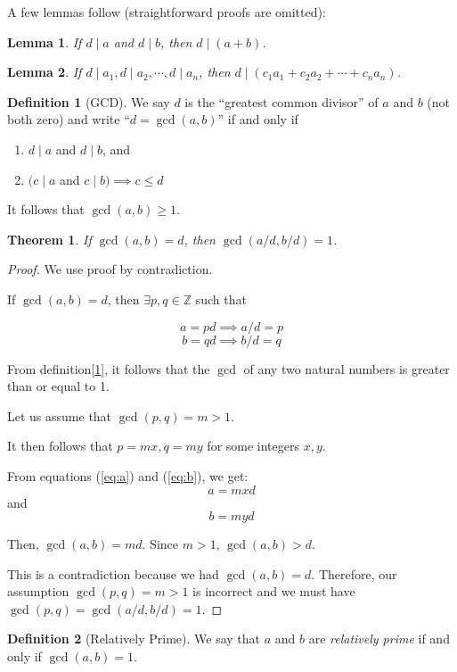 \documentclass[english,notitlepage,smartquotes]{hgbreport}
\theoremstyle{definition}
\newtheorem*{definition}{Definition}
\theoremstyle{remark}
\theoremstyle{plain}
\newtheorem{theorem}{Theorem}[chapter]
\newtheorem{lemma}{Lemma}[chapter]
\begin{document}
A few lemmas follow (straightforward proofs are omitted):
\begin{lemma}
\label{lemma:divides-sum}
If $d\mid a$ and $d\mid b$, then $d\mid(a+b)$.
\end{lemma}
\begin{lemma}
\label{lemma:divides-lin-comb}
If $d\mid a_1,d\mid a_2,\cdots, d\mid a_n$, then $d\mid(c_1a_1+c_2a_2+\cdots+c_na_n)$.
\end{lemma}
\begin{definition}[GCD]
\label{def:gcd}
We say $d$ is the ``greatest common divisor'' of $a$ and $b$ (not both zero) and write ``$d=\gcd(a, b)$'' if and only if
\begin{enumerate}
\item $d\mid a$ and $d\mid b$, and
\item $(c\mid a$ and $c\mid b)\implies c\leq d$
\end{enumerate}
\end{definition}

It follows that $\gcd(a, b)\geq 1$.

\begin{theorem}
\label{thm:gcd-multiple}
If $\gcd(a,b)=d$, then $\gcd(a/d, b/d)=1$.
\end{theorem}

\begin{proof}
We use proof by contradiction.

If $\gcd(a,b)=d$, then $\exists p,q\in\mathbb{Z}$ such that

\begin{equation}
\label{eq:a}
a=pd\implies a/d=p
\end{equation}
\begin{equation}
\label{eq:b}
b=qd\implies b/d=q
\end{equation}

From definition[\ref{def:gcd}], it follows that the $\gcd$ of any two natural numbers is greater than or equal to 1. 

Let us assume that $\gcd(p, q)=m>1$.

It then follows that $p=mx,q=my$ for some integers $x, y$.

From equations (\ref{eq:a}) and (\ref{eq:b}), we get:
$$
a=mxd
$$
and
$$
b=myd
$$

Then, $\gcd(a, b)=md$. Since $m>1$, $\gcd(a, b) > d$.

This is a contradiction because we had $\gcd(a,b)=d$. Therefore, our assumption $\gcd(p,q)=m>1$ is incorrect and we must have $\gcd(p,q)=\gcd(a/d,b/d)=1$.
\end{proof}
\begin{definition}[Relatively Prime]
We say that $a$ and $b$ are \emph{relatively prime} if and only if $\gcd(a,b)=1$.
\end{definition}
\end{document}
